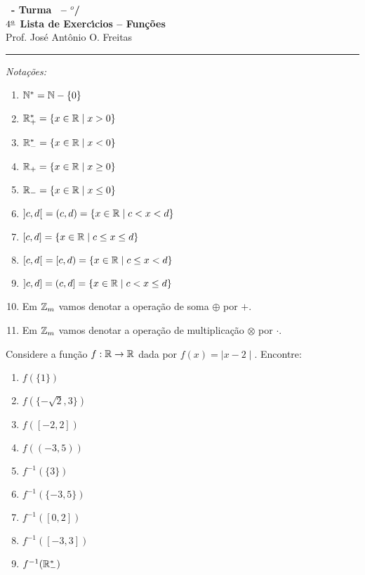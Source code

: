 \documentclass[12pt]{exam}
\begin{document}
\begin{center}
{\Large\bf \disciplina\ - Turma \turma\ -- \semestre$^{o}$/\ano} \\ \vspace{9pt} {\large\bf
  $4^{\underline{a}}$ Lista de Exerc{\'\i}cios -- Fun\c{c}\~oes}\\ \vspace{9pt} Prof. Jos{\'e} Ant{\^o}nio O. Freitas
\end{center}
\hrule

\vspace{.6cm}

\begin{center}
	\textit{Nota\c{c}\~oes:}
\end{center}
\begin{multicols}{2}
	\begin{enumerate}[label={\roman*})]
		\item $\mathbb{N}^* = \mathbb{N} - \{0\}$
		\item $\mathbb{R}^*_+ = \{x \in \mathbb{R} \mid x > 0\}$
		\item $\mathbb{R}^*_- = \{x \in \mathbb{R} \mid x < 0\}$
		\item $\mathbb{R}_+ = \{x \in \mathbb{R} \mid x \ge 0\}$
		\item $\mathbb{R}_- = \{x \in \mathbb{R} \mid x \le 0\}$
		\item $]c,d[\ = (c,d) = \{x \in \mathbb{R} \mid c < x < d\}$
		\item $[c,d] = \{x \in \mathbb{R} \mid c \le x \le d\}$
		\item $[c,d[\ = [c, d) = \{x \in \mathbb{R} \mid c \le x < d\}$
		\item $]c,d] = (c, d] = \{x \in \mathbb{R} \mid c < x \le d\}$
		\item Em $\mathbb{Z}_m$ vamos denotar a opera\c{c}\~ao de soma $\oplus$ por $+$.
		\item Em $\mathbb{Z}_m$ vamos denotar a opera\c{c}\~ao de multiplica\c{c}\~ao $\otimes$ por $\cdot$.
	\end{enumerate}
\end{multicols}

\vspace{.6cm}

\questao{} Considere a fun\c{c}\~ao $f : \mathbb{R} \to \mathbb{R}$ dada por $f(x) = \mid x - 2\mid$. Encontre:
\begin{multicols}{3}
	\begin{enumerate}[label={\alph*})]
		\item $f(\{1\})$
		\item $f(\{-\sqrt{2}, 3\})$
		\item $f([-2,2])$
		\item $f((-3,5))$
		\item $f^{-1}(\{3\})$
		\item $f^{-1}(\{-3,5\})$
		\item $f^{-1}([0,2])$
		\item $f^{-1}([-3,3])$
		\item $f^{-1}(\mathbb{R}^*_-)$
	\end{enumerate}
\end{multicols}
\end{document}
